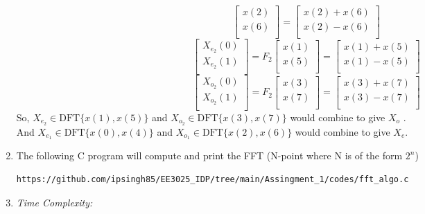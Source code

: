 \documentclass[journal,12pt,twocolumn]{IEEEtran}
\renewcommand\thesection{\arabic{section}}
\begin{document}
\begin{enumerate}[label=\thesection.\arabic*.,ref=\thesection.\theenumi]
\begin{equation}
\begin{bmatrix}
x(2) \\ 
x(6) \\ 
\end{bmatrix}
=
\begin{bmatrix}
x(2)+x(6) \\ 
x(2)-x(6) \\ 
\end{bmatrix}
\end{equation}
\begin{equation}
\begin{bmatrix}
X_{e_{2}}(0) \\ 
X_{e_{2}}(1)\\ 
\end{bmatrix}
= F_{2}
\begin{bmatrix}
x(1) \\ 
x(5) \\ 
\end{bmatrix}
=
\begin{bmatrix}
x(1)+x(5) \\ 
x(1)-x(5) \\ 
\end{bmatrix}
\end{equation}
\begin{equation}
\begin{bmatrix}
X_{o_{2}}(0) \\ 
X_{o_{2}}(1)\\ 
\end{bmatrix}
= F_{2}
\begin{bmatrix}
x(3) \\ 
x(7) \\ 
\end{bmatrix}
=
\begin{bmatrix}
x(3)+x(7) \\ 
x(3)-x(7) \\ 
\end{bmatrix}
\end{equation}
So, $X_{e_{2}} \in \text{DFT} \{x(1),x(5)\}$ and $X_{o_{2}} \in \text{DFT} \{x(3),x(7)\}$ would combine to give $X_{o}$ .
\\And $X_{e_{1}} \in \text{DFT} \{x(0),x(4)\}$ and $X_{o_{1}} \in \text{DFT} \{x(2),x(6)\}$ would combine to give $X_{e}$.
\item The following C program will compute and print the FFT (N-point where N is of the form $2^{n}$)
\begin{lstlisting}
https://github.com/ipsingh85/EE3025_IDP/tree/main/Assingment_1/codes/fft_algo.c
\end{lstlisting}
\item \emph{Time Complexity:}

\end{enumerate}
\end{document}
